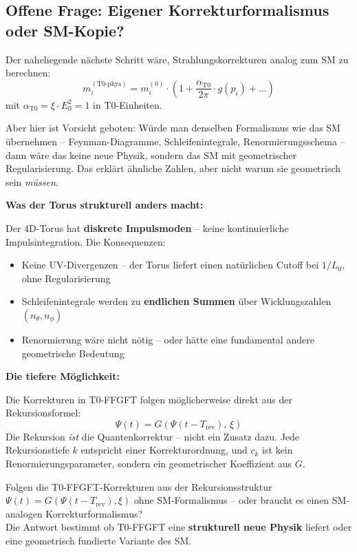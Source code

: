 \subsection{Offene Frage: Eigener Korrekturformalismus oder SM-Kopie?}

Der naheliegende nächste Schritt wäre, Strahlungskorrekturen analog
zum SM zu berechnen:
\begin{equation}
    m_i^{(\text{T0-phys})} = m_i^{(0)} \cdot
    \left(1 + \frac{\alpha_{\text{T0}}}{2\pi} \cdot g(p_i) + \ldots\right)
\end{equation}
mit $\alpha_{\text{T0}} = \xi \cdot E_0^2 = 1$ in T0-Einheiten.

Aber hier ist Vorsicht geboten: Würde man denselben Formalismus wie
das SM übernehmen -- Feynman-Diagramme, Schleifenintegrale,
Renormierungsschema -- dann wäre das keine neue Physik, sondern
das SM mit geometrischer Regularisierung. Das erklärt ähnliche
Zahlen, aber nicht warum sie geometrisch sein \emph{müssen}.

\textbf{Was der Torus strukturell anders macht:}

Der 4D-Torus hat \textbf{diskrete Impulsmoden} -- keine kontinuierliche
Impulsintegration. Die Konsequenzen:
\begin{itemize}
    \item Keine UV-Divergenzen -- der Torus liefert einen natürlichen
          Cutoff bei $1/L_0$, ohne Regularisierung
    \item Schleifenintegrale werden zu \textbf{endlichen Summen}
          über Wicklungszahlen $(n_\theta, n_\phi)$
    \item Renormierung wäre nicht nötig -- oder hätte eine
          fundamental andere geometrische Bedeutung
\end{itemize}

\textbf{Die tiefere Möglichkeit:}

Die Korrekturen in T0-FFGFT folgen möglicherweise direkt aus
der Rekursionsformel:
\begin{equation}
    \Psi(t) = G\!\left(\Psi(t - T_{\text{rev}}),\, \xi\right)
\end{equation}
Die Rekursion \emph{ist} die Quantenkorrektur -- nicht ein Zusatz
dazu. Jede Rekursionstiefe $k$ entspricht einer Korrekturordnung,
und $c_k$ ist kein Renormierungsparameter, sondern ein geometrischer
Koeffizient aus $G$.

\begin{predbox}
Folgen die T0-FFGFT-Korrekturen aus der Rekursionsstruktur
$\Psi(t) = G(\Psi(t-T_{\text{rev}}), \xi)$ ohne SM-Formalismus --
oder braucht es einen SM-analogen Korrekturformalismus?\\[4pt]
Die Antwort bestimmt ob T0-FFGFT eine \textbf{strukturell neue
Physik} liefert oder eine geometrisch fundierte Variante des SM.
\end{predbox}


